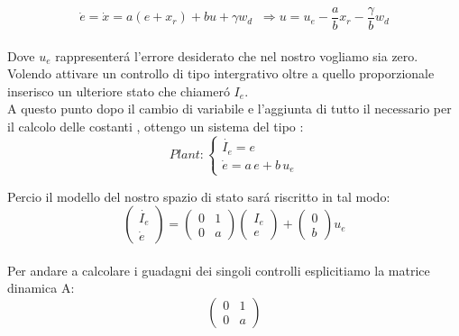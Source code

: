 \documentclass[a4paper,13pt]{article}
\begin{document}
\begin{equation*}
	\dot{e}=\dot{x}=a(e+x_{r})+bu+\gamma w_{d}\,\,\:           %
	\Rightarrow u=u_e-\frac{a}{b} x_{r}-\frac{\gamma}{b} w_{d}
\end{equation*} \\
Dove $u_e$ rappresenter\'a l'errore desiderato che nel nostro vogliamo sia zero.\\
Volendo attivare un controllo di tipo intergrativo oltre a quello proporzionale
inserisco un ulteriore stato che chiamer\'o $I_e$.\\
A questo punto dopo il cambio di variabile e l'aggiunta di tutto il necessario
per il calcolo delle costanti , ottengo un sistema del tipo :
\[Plant	:
\begin{cases}
	
	\dot{I_{e}}= e \\
	\dot{e} = a\,e + b\,u_e
	
\end{cases}\]

Percio il modello del nostro spazio di stato sar\'a riscritto in tal modo:
\begin{equation*}	
\begin{pmatrix}
	
	\dot{I_{e}} \\ \dot{e}
	
\end{pmatrix} =         %
\begin{pmatrix}

	0&1\\0&a

\end{pmatrix}
\begin{pmatrix}

	I_{e}\\e

\end{pmatrix} +           %
\begin{pmatrix}

	0\\b

\end{pmatrix} u_e
\end{equation*} \\
Per andare a calcolare i guadagni dei singoli controlli esplicitiamo la matrice dinamica A:        %
\begin{equation*}
\begin{pmatrix}

	0&1\\0&a

\end{pmatrix}
\end{equation*} \\
\end{document}
